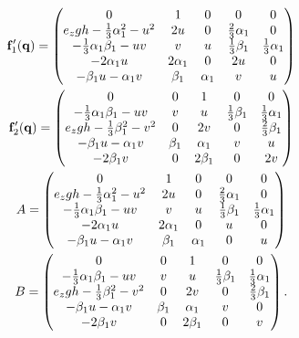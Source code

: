   \begin{gather}
    \mathbf{f}_1'(\mathbf{q}) =
    \begin{pmatrix}
      0 & 1 & 0 & 0 & 0 \\
      e_{z} g h - \frac{1}{3} \alpha_{1}^{2} - u^{2} & 2 u & 0 & \frac{2}{3} \alpha_{1} & 0 \\
      -\frac{1}{3} \alpha_{1} \beta_{1} - u v & v & u & \frac{1}{3} \beta_{1} & \frac{1}{3} \alpha_{1} \\
      -2 \alpha_{1} u & 2 \alpha_{1} & 0 & 2 u & 0 \\
      -\beta_{1} u - \alpha_{1} v & \beta_{1} & \alpha_{1} & v & u
    \end{pmatrix} \\
    \mathbf{f}_2'(\mathbf{q}) =
    \begin{pmatrix}
      0 & 0 & 1 & 0 & 0 \\
      -\frac{1}{3} \alpha_{1} \beta_{1} - u v & v & u & \frac{1}{3} \beta_{1} & \frac{1}{3} \alpha_{1} \\
      e_{z} g h - \frac{1}{3} \beta_{1}^{2} - v^{2} & 0 & 2 v & 0 & \frac{2}{3} \beta_{1} \\
      -\beta_{1} u - \alpha_{1} v & \beta_{1} & \alpha_{1} & v & u \\
      -2 \beta_{1} v & 0 & 2 \beta_{1} & 0 & 2 v
    \end{pmatrix} \\
    A =
    \begin{pmatrix}
      0 & 1 & 0 & 0 & 0 \\
      e_{z} g h - \frac{1}{3} \alpha_{1}^{2} - u^{2} & 2 u & 0 & \frac{2}{3} \alpha_{1} & 0 \\
      -\frac{1}{3} \alpha_{1} \beta_{1} - u v & v & u & \frac{1}{3} \beta_{1} & \frac{1}{3} \alpha_{1} \\
      -2 \alpha_{1} u & 2 \alpha_{1} & 0 & u & 0 \\
      -\beta_{1} u - \alpha_{1} v & \beta_{1} & \alpha_{1} & 0 & u
    \end{pmatrix} \\
    B =
    \begin{pmatrix}
      0 & 0 & 1 & 0 & 0 \\
      -\frac{1}{3} \alpha_{1} \beta_{1} - u v & v & u & \frac{1}{3} \beta_{1} & \frac{1}{3} \alpha_{1} \\
      e_{z} g h - \frac{1}{3} \beta_{1}^{2} - v^{2} & 0 & 2 v & 0 & \frac{2}{3} \beta_{1} \\
      -\beta_{1} u - \alpha_{1} v & \beta_{1} & \alpha_{1} & v & 0 \\
      -2 \beta_{1} v & 0 & 2 \beta_{1} & 0 & v
    \end{pmatrix}.
  \end{gather}
